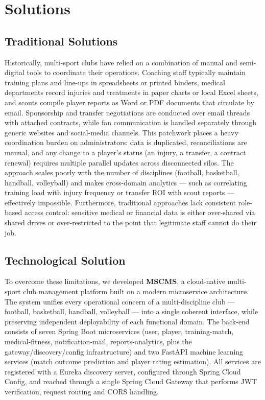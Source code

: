 \documentclass[12pt,a4paper,oneside]{report}
\begin{document}
\section{Solutions}
\label{sec:solutions}

\subsection{Traditional Solutions}
Historically, multi-sport clubs have relied on a combination of manual
and semi-digital tools to coordinate their operations. Coaching staff
typically maintain training plans and line-ups in spreadsheets or
printed binders, medical departments record injuries and treatments in
paper charts or local Excel sheets, and scouts compile player reports
as Word or PDF documents that circulate by email. Sponsorship and
transfer negotiations are conducted over email threads with attached
contracts, while fan communication is handled separately through
generic websites and social-media channels. This patchwork places a
heavy coordination burden on administrators: data is duplicated,
reconciliations are manual, and any change to a player's status (an
injury, a transfer, a contract renewal) requires multiple parallel
updates across disconnected silos. The approach scales poorly with the
number of disciplines (football, basketball, handball, volleyball) and
makes cross-domain analytics --- such as correlating training load with
injury frequency or transfer ROI with scout reports --- effectively
impossible. Furthermore, traditional approaches lack consistent
role-based access control: sensitive medical or financial data is
either over-shared via shared drives or over-restricted to the point
that legitimate staff cannot do their job.

\subsection{Technological Solution}
To overcome these limitations, we developed \textbf{MSCMS}, a
cloud-native multi-sport club management platform built on a modern
microservice architecture. The system unifies every operational concern
of a multi-discipline club --- football, basketball, handball,
volleyball --- into a single coherent interface, while preserving
independent deployability of each functional domain. The back-end
consists of seven Spring Boot microservices (user, player, training-match,
medical-fitness, notification-mail, reports-analytics, plus the
gateway/discovery/config infrastructure) and two FastAPI machine
learning services (match outcome prediction and player rating
estimation). All services are registered with a Eureka discovery
server, configured through Spring Cloud Config, and reached through a
single Spring Cloud Gateway that performs JWT verification, request
routing and CORS handling.
\end{document}
